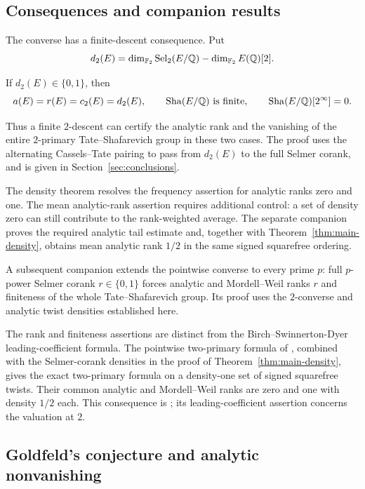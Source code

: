 \subsection{Consequences and companion results}

The converse has a finite-descent consequence. Put
\[
 d_2(E)=\dim_{\mathbb F_2}\operatorname{Sel}_2(E/\mathbb Q)-\dim_{\mathbb F_2}E(\mathbb Q)[2].
\]

\begin{corollary}\label{cor:finite-descent}
If $d_2(E)\in\{0,1\}$, then
\[
 a(E)=r(E)=c_2(E)=d_2(E),\qquad
 \operatorname{Sha}(E/\mathbb Q)\text{ is finite},\qquad \operatorname{Sha}(E/\mathbb Q)[2^\infty]=0.
\]
\end{corollary}

Thus a finite $2$-descent can certify the analytic rank and the vanishing
of the entire $2$-primary Tate--Shafarevich group in these two cases.
The proof uses the alternating Cassels--Tate pairing to pass from
$d_2(E)$ to the full Selmer corank, and is given in
Section~\ref{sec:conclusions}.

The density theorem resolves the frequency assertion for analytic ranks
zero and one. The mean analytic-rank assertion requires additional
control: a set of density zero can still contribute to the rank-weighted
average. The separate companion
\citet[Theorems~1.1 and~1.2]{OpenAIMeanAnalyticRank2026} proves the
required analytic tail estimate and, together with
Theorem~\ref{thm:main-density}, obtains mean analytic rank $1/2$
in the same signed squarefree ordering.

A subsequent companion \citep[Theorem~1.1]{OpenAIAllPrimeSelmer2026}
extends the pointwise converse to every prime $p$: full $p$-power Selmer
corank $r\in\{0,1\}$ forces analytic and Mordell--Weil ranks $r$
and finiteness of the whole Tate--Shafarevich group. Its proof uses the
$2$-converse and analytic twist densities established here.

The rank and finiteness assertions are distinct from the
Birch--Swinnerton-Dyer leading-coefficient formula.
The pointwise two-primary formula of
\citet[Theorem~1.1]{OpenAITwoPrimaryBSD2026}, combined with the
Selmer-corank densities in the proof of Theorem~\ref{thm:main-density},
gives the exact two-primary formula on a density-one set of signed
squarefree twists. Their common analytic and Mordell--Weil ranks are
zero and one with density $1/2$ each. This consequence is
\citet[Corollary~16.1]{OpenAITwoPrimaryBSD2026}; its leading-coefficient
assertion concerns the valuation at $2$.

\subsection{Goldfeld's conjecture and analytic nonvanishing}

